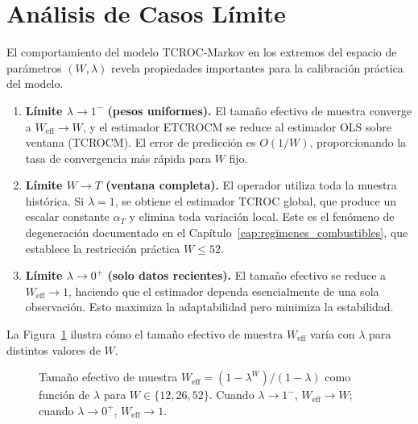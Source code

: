 \section{Análisis de Casos Límite}
\label{sec:markov_casos_limite}

El comportamiento del modelo TCROC-Markov en los extremos del
espacio de parámetros $(W, \lambda)$ revela propiedades importantes
para la calibración práctica del modelo.

\begin{enumerate}
  \item \textbf{Límite $\lambda \to 1^-$ (pesos uniformes).}
    El tamaño efectivo de muestra converge a $W_{\mathrm{eff}}
    \to W$, y el estimador ETCROCM se reduce al estimador OLS
    sobre ventana (TCROCM).  El error de predicción es
    $O(1/W)$, proporcionando la tasa de convergencia más rápida
    para $W$ fijo.

  \item \textbf{Límite $W \to T$ (ventana completa).}
    El operador utiliza toda la muestra histórica.  Si
    $\lambda = 1$, se obtiene el estimador TCROC global, que
    produce un escalar constante $\alpha_T$ y elimina toda
    variación local.  Este es el fenómeno de degeneración
    documentado en el Capítulo~\ref{cap:regimenes_combustibles},
    que establece la restricción práctica $W \leq 52$.

  \item \textbf{Límite $\lambda \to 0^+$ (solo datos recientes).}
    El tamaño efectivo se reduce a $W_{\mathrm{eff}} \to 1$,
    haciendo que el estimador dependa esencialmente de una sola
    observación.  Esto maximiza la adaptabilidad pero minimiza
    la estabilidad.
\end{enumerate}

La Figura~\ref{fig:weff_lambda} ilustra cómo el tamaño efectivo
de muestra $W_{\mathrm{eff}}$ varía con $\lambda$ para distintos
valores de $W$.

\begin{figure}[H]
\centering
{}
\caption{Tamaño efectivo de muestra
$W_{\mathrm{eff}} = (1 - \lambda^W)/(1 - \lambda)$ como función de
$\lambda$ para $W \in \{12, 26, 52\}$.  Cuando $\lambda \to 1^-$,
$W_{\mathrm{eff}} \to W$; cuando $\lambda \to 0^+$,
$W_{\mathrm{eff}} \to 1$.}
\label{fig:weff_lambda}
\end{figure}




